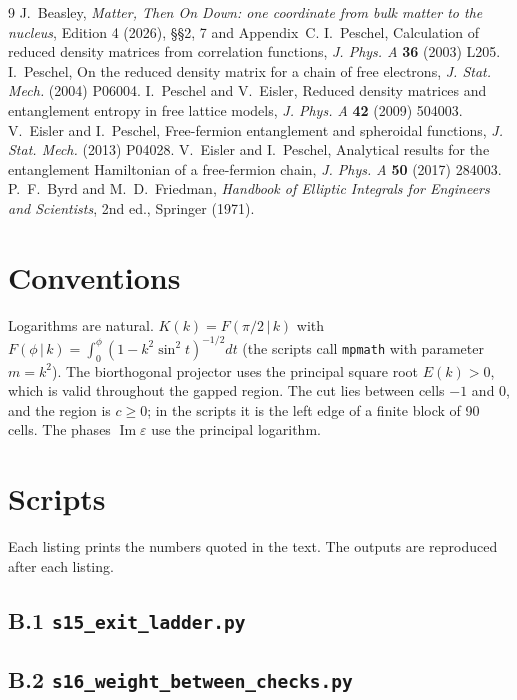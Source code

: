 \documentclass[11pt]{article}
\theoremstyle{definition}
\newcommand{\Ima}{\operatorname{Im}}
\begin{document}
\begin{thebibliography}{9}
 J.~Beasley, \emph{Matter, Then On Down: one coordinate from bulk matter to the nucleus}, Edition 4 (2026), §§2, 7 and Appendix~C.
 I.~Peschel, Calculation of reduced density matrices from correlation functions, \emph{J. Phys. A} \textbf{36} (2003) L205.
 I.~Peschel, On the reduced density matrix for a chain of free electrons, \emph{J. Stat. Mech.} (2004) P06004.
 I.~Peschel and V.~Eisler, Reduced density matrices and entanglement entropy in free lattice models, \emph{J. Phys. A} \textbf{42} (2009) 504003.
 V.~Eisler and I.~Peschel, Free-fermion entanglement and spheroidal functions, \emph{J. Stat. Mech.} (2013) P04028.
 V.~Eisler and I.~Peschel, Analytical results for the entanglement Hamiltonian of a free-fermion chain, \emph{J. Phys. A} \textbf{50} (2017) 284003.
 P.~F.~Byrd and M.~D.~Friedman, \emph{Handbook of Elliptic Integrals for Engineers and Scientists}, 2nd ed., Springer (1971).
\end{thebibliography}

\appendix
\section{Conventions}
Logarithms are natural. $K(k)=F(\pi/2\,|\,k)$ with $F(\phi\,|\,k)=\int_0^\phi(1-k^2\sin^2t)^{-1/2}dt$ (the scripts call \texttt{mpmath} with parameter $m=k^2$). The biorthogonal projector uses the principal square root $E(k)>0$, which is valid throughout the gapped region. The cut lies between cells $-1$ and $0$, and the region is $c\ge0$; in the scripts it is the left edge of a finite block of 90 cells. The phases $\Ima\varepsilon$ use the principal logarithm.

\section{Scripts}
Each listing prints the numbers quoted in the text. The outputs are reproduced after each listing.

\subsection*{B.1 \texttt{s15\_exit\_ladder.py}}


\subsection*{B.2 \texttt{s16\_weight\_between\_checks.py}}


\end{document}
